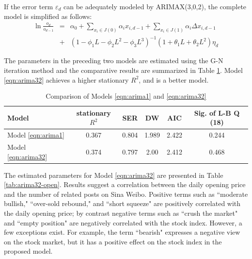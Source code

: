 \documentclass[review,3p,times,12pt,number]{elsarticle}
\begin{document}
If the error term $\varepsilon_d$ can be adequately modeled by ARIMAX(3,0,2), the complete model is simplified as follows:
\begin{eqnarray}
    \ln \frac{o_d}{o_{d-1}} & = & \alpha_0 + \sum_{x_i \in J(0)} \alpha_i x_{i,d-1} + \sum_{x_i \in J(1)} \alpha_i \Delta x_{i,d-1} \nonumber \\
                           & + & (1-\phi_1L-\phi_2L^2-\phi_3L^3)^{-1}(1 + \theta_1 L + \theta_2 L^2) \eta_d \label{eqn:arima32}
\end{eqnarray}

The parameters in the preceding two models are estimated using the G-N iteration method and the comparative results are summarized in Table \ref{tab:comp}. Model \ref{eqn:arima32} achieves a higher stationary $R^2$, and is a better model.

\begin{table}[htbp]
\caption{Comparison of Models \ref{eqn:arima1} and \ref{eqn:arima32}}
\label{tab:comp}
\center
\begin{tabular} {l c c c c c}
\hline
Model                   & stationary $R^2$ & SER   & DW    & AIC   & Sig. of L-B Q (18)\\
\hline
Model \ref{eqn:arima1}  & 0.367            & 0.804 & 1.989 & 2.422 & 0.244\\
Model \ref{eqn:arima32} & 0.374            & 0.797 & 2.00  & 2.412 & 0.468\\
\hline
\end{tabular}
\end{table}

The estimated parameters for Model \ref{eqn:arima32} are presented in Table \ref{tab:arima32-open}. Results suggest a correlation between the daily opening price and the number of related posts on Sina Weibo. Positive terms such as ``moderate bullish," ``over-sold rebound," and ``short squeeze" are positively correlated with the daily opening price; by contrast negative terms such as ``crush the market" and ``empty position" are negatively correlated with the stock index. However, a few exceptions exist. For example, the term ``bearish" expresses a negative view on the stock market, but it has a positive effect on the stock index in the proposed model.
\end{document}
